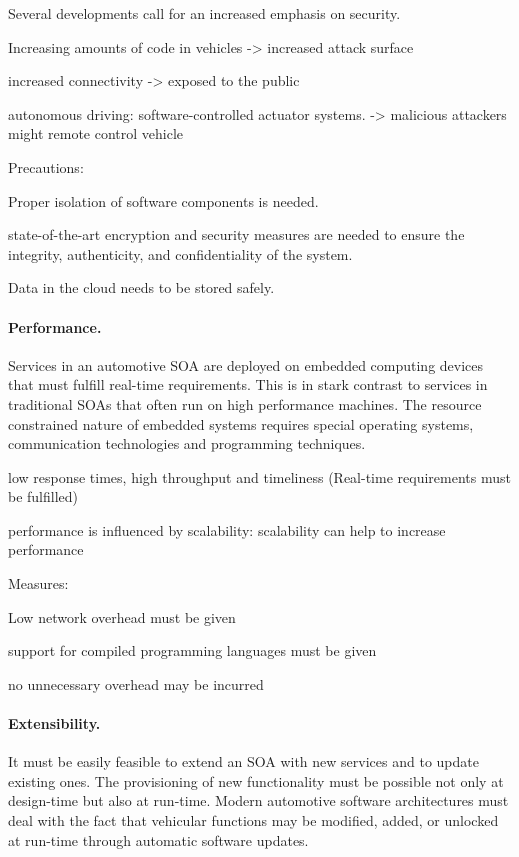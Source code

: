 Several developments call for an increased emphasis on security.

Increasing amounts of code in vehicles -> increased attack surface

increased connectivity -> exposed to the public 

autonomous driving: software-controlled actuator systems. -> malicious attackers might remote control vehicle


Precautions:

Proper isolation of software components is needed.

state-of-the-art encryption and security measures are needed to ensure the integrity, authenticity, and confidentiality of the system.

Data in the cloud needs to be stored safely.


\paragraph{Performance.}
Services in an automotive SOA are deployed on embedded computing devices that must fulfill real-time requirements. This is in stark contrast to services in traditional SOAs that often run on high performance machines. The resource constrained nature of embedded systems requires special operating systems, communication technologies and programming techniques.

low response times, high throughput and timeliness (Real-time requirements must be fulfilled)

performance is influenced by scalability: scalability can help to increase performance

Measures:

Low network overhead must be given

support for compiled programming languages must be given

no unnecessary overhead may be incurred


\paragraph{Extensibility.} 
It must be easily feasible to extend an SOA with new services and to update existing ones. The provisioning of new functionality must be possible not only at design-time but also at run-time. Modern automotive software architectures must deal with the fact that vehicular functions may be modified, added, or unlocked at run-time through automatic software updates.

